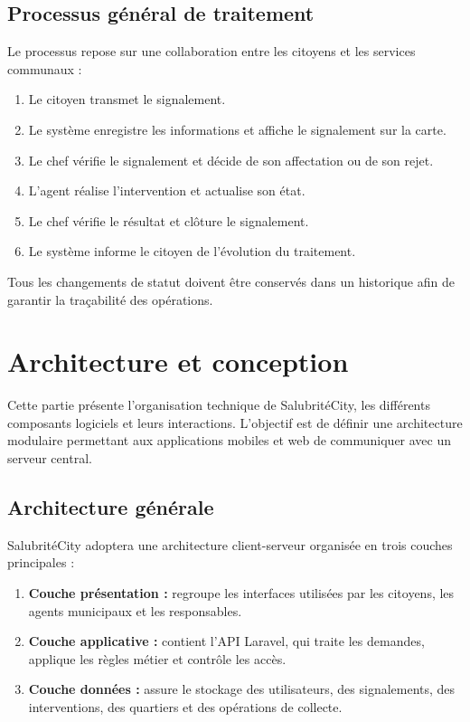 \documentclass[11pt,a4paper,oneside]{report}
\begin{document}
	\subsection{Processus général de traitement}
	
	Le processus repose sur une collaboration entre les citoyens
	et les services communaux :
	
	\begin{enumerate}
		\item Le citoyen transmet le signalement.
		\item Le système enregistre les informations et affiche
		le signalement sur la carte.
		\item Le chef vérifie le signalement et décide de son
		affectation ou de son rejet.
		\item L'agent réalise l'intervention et actualise son état.
		\item Le chef vérifie le résultat et clôture le signalement.
		\item Le système informe le citoyen de l'évolution du traitement.
	\end{enumerate}
	
	Tous les changements de statut doivent être conservés dans
	un historique afin de garantir la traçabilité des opérations.
	
	
	\section{Architecture et conception}
	
	Cette partie présente l'organisation technique de SalubritéCity,
	les différents composants logiciels et leurs interactions.
	L'objectif est de définir une architecture modulaire permettant
	aux applications mobiles et web de communiquer avec un serveur central.
	
	\subsection{Architecture générale}
	
	SalubritéCity adoptera une architecture client-serveur organisée
	en trois couches principales :
	
	\begin{enumerate}
		\item \textbf{Couche présentation :} regroupe les interfaces
		utilisées par les citoyens, les agents municipaux et les responsables.
		
		\item \textbf{Couche applicative :} contient l'API Laravel,
		qui traite les demandes, applique les règles métier et contrôle
		les accès.
		
		\item \textbf{Couche données :} assure le stockage des utilisateurs,
		des signalements, des interventions, des quartiers et des
		opérations de collecte.
	\end{enumerate}
	
\end{document}
